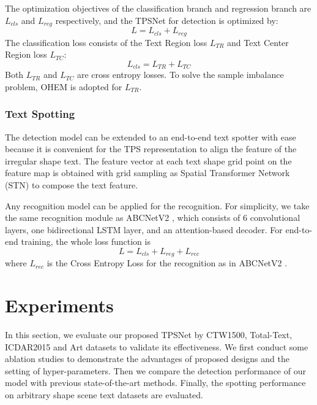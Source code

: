 \documentclass[sigconf]{acmart}
\begin{document}
	The optimization objectives of the classification branch and regression branch are $L_{cls}$ and $L_{reg}$ respectively, and the TPSNet for detection is optimized by:
	\begin{equation}
	L = L_{cls} + L_{reg}
	\end{equation}
	The classification loss consists of the Text Region loss $L_{TR}$ and Text Center Region loss $L_{TC}$:
	\begin{equation}
	L_{cls} = L_{TR} + L_{TC}
	\end{equation}
	Both $L_{TR}$ and $L_{TC}$ are cross entropy losses. To solve the sample imbalance problem, OHEM \cite{zhu2021fourier} is adopted for $L_{TR}$.


	\subsubsection{Text Spotting}
	The detection model can be extended to an end-to-end text spotter with ease because it is convenient for the TPS representation to align the feature of the irregular shape text. The feature vector at each text shape grid point on the feature map is obtained with grid sampling as Spatial Transformer Network (STN) \cite{jaderberg2015spatial} to compose the text feature.
	
	Any recognition model can be applied for the recognition. For simplicity, we take the same recognition module as ABCNetV2 \cite{abcnetv2}, which consists of 6 convolutional layers, one bidirectional LSTM layer, and an attention-based decoder.  For end-to-end training, the whole loss function is 
	\begin{equation}
	L = L_{cls} + L_{reg} + L_{rec}
	\end{equation}
	where $L_{rec}$ is the Cross Entropy Loss for the recognition as in ABCNetV2 \cite{abcnetv2}.
	
	\section{Experiments}
	In this section, we evaluate our proposed TPSNet by CTW1500, Total-Text,  ICDAR2015 and Art datasets to validate its effectiveness. We first conduct some ablation studies to demonstrate the advantages of proposed designs and the setting of hyper-parameters. Then we compare the detection performance of our model with previous state-of-the-art methods. Finally, the spotting performance on arbitrary shape scene text datasets are evaluated.
	
\end{document}
